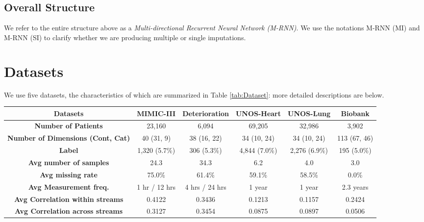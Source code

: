 \documentclass{article}
\begin{document}
	\subsection{Overall Structure } We refer to the entire structure above as a {\em Multi-directional Recurrent Neural Network (M-RNN)}.   We use the notations M-RNN (MI) and M-RNN (SI) to clarify whether we are producing multiple or single imputations.
	
	
	\section{Datasets}\label{sect:dataset}
	We use five datasets, the characteristics of which are summarized in Table \ref{tab:Dataset}: more detailed descriptions are below.


	\begin{table*}[t!]
		\caption{Summary of the datasets (Cont: Continuous, Cat: Categorical, Avg: Average)}
		\label{tab:Dataset}
		\centering
		\small
		\begin{tabular}{c|c|c|c|c|c}
			\toprule
			\textbf{Datasets} & \textbf{MIMIC-III} & \textbf{Deterioration} & \textbf{UNOS-Heart} & \textbf{UNOS-Lung} &\textbf{Biobank}\\
			\midrule
			\textbf{Number of Patients} & 23,160& 6,094&69,205& 32,986 & 3,902\\
			\midrule
			\textbf{Number of Dimensions (Cont, Cat)} &40 (31, 9) & 38 (16, 22) & 34 (10, 24) & 34 (10, 24) & 113 (67, 46)\\		
			\midrule
			{\textbf{Label} } &1,320 (5.7\%) &306 (5.3\%) & 4,844 (7.0\%) & 2,276 (6.9\%) & 195 (5.0\%)\\
			\midrule
			\textbf{Avg number of samples} & 24.3 & 34.3 & 6.2 & 4.0 & 3.0\\
			\midrule
			\textbf{Avg missing rate} & 75.0\% &61.4\%& 59.1\% & 58.5\% & 0.0\% \\
			\midrule
			\textbf{Avg Measurement freq.} & 1 hr / 12 hrs & 4 hrs / 24 hrs&1 year & 1 year & 2.3 years\\
			\midrule
			\textbf{Avg Correlation within streams}  & {0.4122} & {0.3436} & {0.1213}&{0.1157} & {0.2424}\\
			\midrule
			\textbf{Avg Correlation across streams}  & {0.3127} & {0.3454} &{0.0875}&{0.0897} & {0.0506}\\
			\bottomrule
		\end{tabular}
	\end{table*}
	
	
\end{document}
